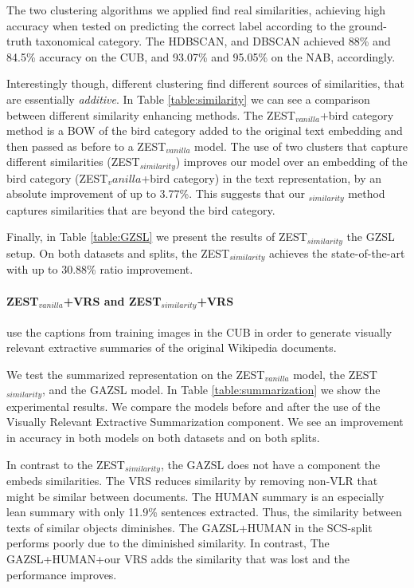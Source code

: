 \documentclass[11pt,a4paper]{article}
\newcommand\reut[1]{\textcolor{green}{\textbf{REUT:} #1 }}
\begin{document}


The two clustering algorithms we applied find real similarities, achieving high accuracy when tested on predicting the correct label according to the ground-truth taxonomical category. The HDBSCAN, and DBSCAN achieved 88\% and 84.5\% accuracy on the CUB, and 93.07\% and 95.05\% on the NAB, accordingly.

Interestingly though, different clustering find different sources of similarities, that are essentially {\em additive}. In Table \ref{table:similarity} we can see a comparison between different similarity enhancing methods. 
The ZEST$_{vanilla}$+bird category method is a BOW of the bird category added to the original text embedding and then passed as before to a ZEST$_{vanilla}$ model. 
The use of two clusters that capture different similarities (ZEST$_{similarity}$) improves our model over an embedding of the bird category (ZEST$_vanilla$+bird category) in the text representation, by an absolute improvement of up to 3.77\%. This suggests that our $_{similarity}$ method captures similarities that are beyond the bird category. %

Finally, 
in Table \ref{table:GZSL} we present the results of ZEST$_{similarity}$  the GZSL setup. On both datasets and splits, the ZEST$_{similarity}$ achieves the state-of-the-art with up to 30.88\% ratio improvement.

\paragraph{ ZEST$_{vanilla}$+VRS and ZEST$_{similarity}$+VRS }
use the captions from training images in the CUB in order to generate visually relevant extractive summaries of the original Wikipedia documents.

We test the summarized representation on the ZEST$_{vanilla}$ model, the ZEST$_{similarity}$, and the GAZSL \citep{zhu2018generative} model. In Table \ref{table:summarization} we show the experimental results. We compare the models before and after the use of the Visually Relevant  Extractive Summarization component. We see an improvement in accuracy in both models on both datasets and on both splits. 

In contrast to the ZEST$_{similarity}$, the GAZSL does not have a component the embeds similarities. The VRS reduces similarity by removing non-VLR that might be similar between documents. 
The HUMAN summary is an especially lean summary with only 11.9\% sentences extracted. Thus, the similarity between texts of similar objects diminishes. The GAZSL+HUMAN in the SCS-split performs poorly due to the diminished similarity. In contrast, The GAZSL+HUMAN+our VRS adds the similarity that was lost and the performance improves.
\end{document}
